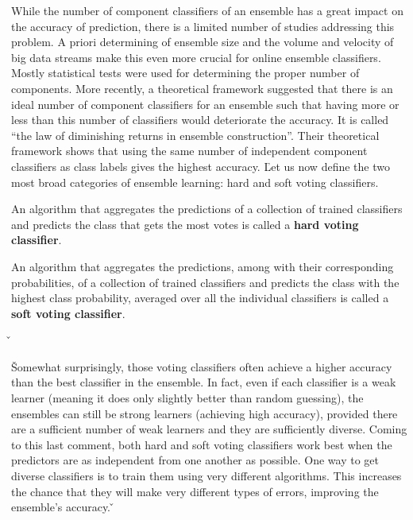 While the number of component classifiers of an ensemble has a great impact on the accuracy of prediction, there is a
limited number of studies addressing this problem. A priori determining of ensemble size and the volume and velocity
of big data streams make this even more crucial for online ensemble classifiers. Mostly statistical tests were used
for determining the proper number of components. More recently, a theoretical framework suggested that there is an
ideal number of component classifiers for an ensemble such that having more or less than this number of classifiers
would deteriorate the accuracy. It is called ``the law of diminishing returns in ensemble construction''. Their
theoretical framework shows that using the same number of independent component classifiers as class labels gives the
highest accuracy. \v

Let us now define the two most broad categories of ensemble learning: hard and soft voting classifiers.

An algorithm that aggregates the predictions of a collection of trained classifiers and predicts the class that gets
the most votes is called a \textbf{hard voting classifier}.
\ed

An algorithm that aggregates the predictions, among with their corresponding probabilities, of a collection of
trained classifiers and predicts the class with the highest class probability, averaged over all the individual
classifiers is called a \textbf{soft voting classifier}.
\ed

\v


\v

Somewhat surprisingly, those voting classifiers often achieve a higher accuracy than the best classifier in the
ensemble. In fact, even if each classifier is a weak learner (meaning it does only slightly better than random
guessing), the ensembles can still be strong learners (achieving high accuracy), provided there are a sufficient
number of weak learners and they are sufficiently diverse. Coming to this last comment, both hard and soft voting
classifiers work best when the predictors are as independent from one another as possible. One way to get diverse
classifiers is to train them using very different algorithms. This increases the chance that they will make very
different types of errors, improving the ensemble's accuracy. \v

